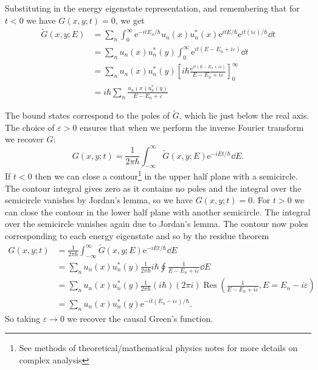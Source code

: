 \documentclass[fleqn]{NotesClass}
\newcommand*{\e}{\mathrm{e}}
\DeclareMathOperator{\Res}{Res}
\begin{document}
    Substituting in the energy eigenstate representation, and remembering that for \(t < 0\) we have \(G(x, y; t) = 0\), we get
    \begin{align}
        \tilde{G}(x, y; E) &= \sum_n \int_{0}^{\infty} \e^{-itE_n/\hbar}u_n(x)u_n^*(x) \e^{itE/\hbar} \e^{it(i\varepsilon)/\hbar} \dd{t}\\
        &= \sum_n u_n(x)u_n^*(y) \int_{0}^{\infty} \e^{it(E - E_n + i\varepsilon)}\dd{t}\\
        &= \sum_n u_n(x)u_n^*(y) \left[ i\hbar \frac{\e^{it(E - E_n + i\varepsilon)}}{E - E_n + i\varepsilon} \right]_{0}^{\infty}\\
        &= i\hbar \sum_n \frac{u_n(x)u_n^*(y)}{E - E_n + \varepsilon}
    \end{align}
    
    The bound states correspond to the poles of \(\tilde{G}\), which lie just below the real axis.
    The choice of \(\varepsilon > 0\) ensures that when we perform the inverse Fourier transform we recover \(G\):
    \begin{equation}
        G(x, y; t) = \frac{1}{2\pi\hbar} \int_{-\infty}^{\infty} \tilde{G}(x, y; E) \e^{-iEt/\hbar} \dd{E}.
    \end{equation}
    If \(t < 0\) then we can close a contour\footnote{See methods of theoretical/mathematical physics notes for more details on complex analysis} in the upper half plane with a semicircle.
    The contour integral gives zero as it contains no poles and the integral over the semicircle vanishes by Jordan's lemma, so we have \(G(x, y; t) = 0\).
    For \(t > 0\) we can close the contour in the lower half plane with another semicircle.
    The integral over the semicircle vanishes again due to Jordan's lemma.
    The contour now poles corresponding to each energy eigenstate and so by the residue theorem
    \begin{align}
        G(x, y; t) &= \frac{1}{2\pi\hbar} \int_{-\infty}^{\infty} \tilde{G}(x, y; E) \e^{-iEt/\hbar} \dd{E}\\
        &= \sum_n u_n(x) u_n^*(y) \frac{1}{2\pi \hbar} i\hbar \oint \frac{1}{E - E_n + i\varepsilon} \dd{E}\\
        &= \sum_n u_n(x) u_n^*(y) \frac{1}{2\pi \hbar} (i\hbar) (2\pi i) \Res\left( \frac{1}{E - E_n + i\varepsilon}, E = E_n - i\varepsilon \right)\\
        &= \sum_n u_n(x) u_n^*(y)\e^{-it(E_n - i\varepsilon)/\hbar}.
    \end{align}
    So taking \(\varepsilon \to 0\) we recover the causal Green's function.
    
\end{document}

